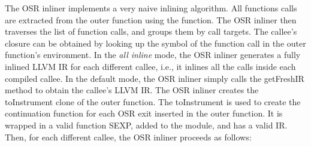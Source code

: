 The OSR inliner implements a very naive inlining algorithm.
All functions calls are extracted from the outer function using the  function.
The OSR inliner then traverses the list of function calls, and groups them by call targets.
The callee's closure can be obtained by looking up the symbol of the function call in the outer function's environment.
In the \textit{all inline} mode, the OSR inliner generates a fully inlined LLVM IR for each different callee, i.e., it inlines all the calls inside each compiled callee. 
In the default mode, the OSR inliner simply calls the getFreshIR method to obtain the callee's LLVM IR.
The OSR inliner creates the toInstrument clone of the outer function.
The toInstrument is used to create the continuation function for each OSR exit inserted in the outer function.
It is wrapped in a valid function SEXP, added to the module, and has a valid IR.
Then, for each different callee, the OSR inliner proceeds as follows: 
